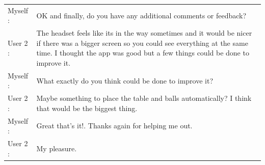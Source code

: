 \documentclass[ %
                author={Finn Alexander Wilkinson},
                supervisor={Dr. Andrew Calway},
                degree={MEng},
                title={\centering A Mixed Reality Aim Assistant for Pool and Snooker},
                subtitle={},
                type={Enterprise},
                year={2021} ]{dissertation}
\begin{document}
\begin{tabular}{l p{130mm}}
    Myself : & OK and finally, do you have any additional comments or feedback? \\
    User 2 : & The headset feels like its in the way sometimes and it would be nicer if there was a bigger screen so you could see everything at the same time. I thought the app was good but a few things could be done to improve it.\\
    Myself : & What exactly do you think could be done to improve it? \\
    User 2 : & Maybe something to place the table and balls automatically? I think that would be the biggest thing.\\
    Myself : & Great that's it!. Thanks again for helping me out. \\
    User 2 : & My pleasure. \\
\end{tabular}
\end{document}
